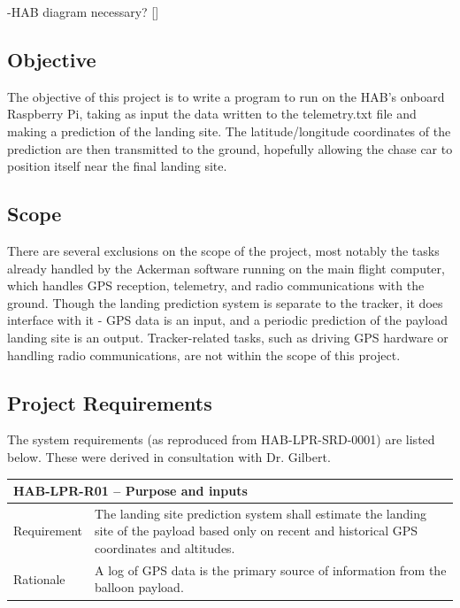 \documentclass[11pt]{article}
\begin{document}
-HAB diagram necessary? []

\subsection{Objective}
The objective of this project is to write a program to run on the HAB's onboard Raspberry Pi, taking as input the data written to the telemetry.txt file and making a prediction of the landing site. The latitude/longitude coordinates of the prediction are then transmitted to the ground, hopefully allowing the chase car to position itself near the final landing site.

\subsection{Scope}

There are several exclusions on the scope of the project, most notably the tasks already handled by the Ackerman software running on the main flight computer, which handles GPS reception, telemetry, and radio communications with the ground. Though the landing prediction system is separate to the tracker, it does interface with it - GPS data is an input, and a periodic prediction of the payload landing site is an output. Tracker-related tasks, such as driving GPS hardware or handling radio communications, are not within the scope of this project.



\subsection{Project Requirements}

The system requirements (as reproduced from HAB-LPR-SRD-0001) are listed below. These were derived in consultation with Dr. Gilbert.

\FloatBarrier

\begin{table}[!htbp] \centering
 \begin{tabular}{|p{2cm} p{11cm}|}
 \hline
  \multicolumn{2}{|l|}{HAB-LPR-R01 – Purpose and inputs} \\
  \hline
  Requirement & The landing site prediction system shall estimate the landing site of the payload based only on recent and historical GPS coordinates and altitudes. \\
  \hline
  Rationale & A log of GPS data is the primary source of information from the balloon payload.  \\
  \hline
 \end{tabular}
\end{table}
\end{document}
